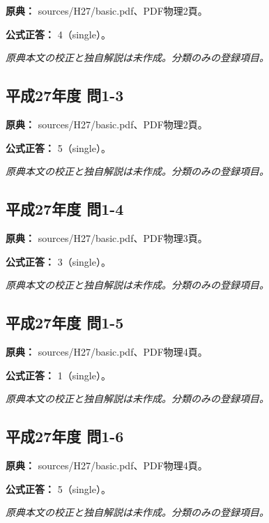 \noindent\textbf{原典：} sources/H27/basic.pdf、PDF物理2頁。

\textbf{公式正答：} 4（single）。

\par\textit{原典本文の校正と独自解説は未作成。分類のみの登録項目。}

\subsection{平成27年度 問1-3}
\label{q:h27-reg-basic-1-3}

\noindent\textbf{原典：} sources/H27/basic.pdf、PDF物理2頁。

\textbf{公式正答：} 5（single）。

\par\textit{原典本文の校正と独自解説は未作成。分類のみの登録項目。}

\subsection{平成27年度 問1-4}
\label{q:h27-reg-basic-1-4}

\noindent\textbf{原典：} sources/H27/basic.pdf、PDF物理3頁。

\textbf{公式正答：} 3（single）。

\par\textit{原典本文の校正と独自解説は未作成。分類のみの登録項目。}

\subsection{平成27年度 問1-5}
\label{q:h27-reg-basic-1-5}

\noindent\textbf{原典：} sources/H27/basic.pdf、PDF物理4頁。

\textbf{公式正答：} 1（single）。

\par\textit{原典本文の校正と独自解説は未作成。分類のみの登録項目。}

\subsection{平成27年度 問1-6}
\label{q:h27-reg-basic-1-6}

\noindent\textbf{原典：} sources/H27/basic.pdf、PDF物理4頁。

\textbf{公式正答：} 5（single）。

\par\textit{原典本文の校正と独自解説は未作成。分類のみの登録項目。}

